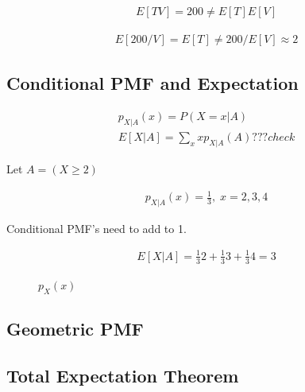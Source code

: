 \begin{align*}
E[TV] = 200 \ne E[T]E[V]
\end{align*}

\begin{align*}
E[200/V] = E[T] \ne 200/E[V] \approx 2
\end{align*}

\subsection{Conditional PMF and Expectation}


\begin{align*}
p_{X|A}(x) = P(X=x|A)\\
E[X|A] = \sum_x x p_{X|A}(A) ???check
\end{align*}

Let $A=(X \ge 2)$

\begin{align*}
p_{X|A}(x) = \frac{1}{3},\; x=2,3,4
\end{align*}

Conditional PMF's need to add to 1.

\begin{align*}
E[X|A] = \frac{1}{3}2 + \frac{1}{3}3 + \frac{1}{3}4=3
\end{align*}


\begin{figure}[h]
\centering
{}
\caption{$p_X(x)$}
\end{figure}


\subsection{Geometric PMF}

\subsection{Total Expectation Theorem}


